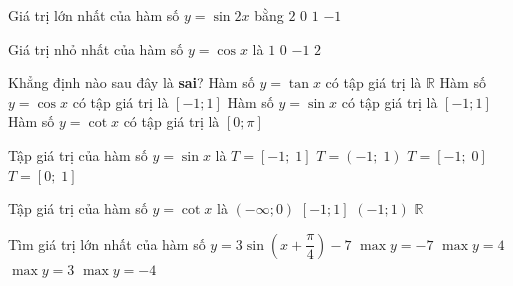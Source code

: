 \begin{ex}%
	Giá trị lớn nhất của hàm  số $y=\sin 2x$ bằng
	 \choice
		 {$2$}
		{$0$} 
		 {\True $1$}
		{$-1$} 
\end{ex}

\begin{ex}%
	Giá trị  nhỏ nhất của hàm số $y=\cos x$ là
	 \choice
		 {$1$}
		{$0$} 
		{\True $-1$} 
		 {$2$}
\end{ex}

\begin{ex}%
	Khẳng định nào sau đây là {\bf sai}? 
	\choice 
		{Hàm số $y=\tan x$  có tập giá trị là $\mathbb{R}$}
		{Hàm  số $y=\cos x$ có tập giá trị là $\left[-1;1\right]$}
		 {Hàm số $y=\sin x$ có tập giá trị là $\left[-1;1\right]$}
		{\True Hàm số  $y=\cot x$ có tập giá trị là $\left[0;\pi \right]$}
\end{ex}

\begin{ex}%
	Tập  giá trị của hàm số $y=\sin x$ là
	 \choice
		{\True  $T=\left[-1;\; 1\right]$}
		 {$T=(-1;\; 1)$}
		{$T=\left[-1;\;  0\right]$}
		 {$T=\left[0;\; 1\right]$}
\end{ex}

\begin{ex}%
	Tập giá trị của hàm số  $y=\cot x$ là
	 \choice
		{$\left( -\infty;0 \right)$} 
		 {$\left[-1;1 \right]$}
		{$\left( -1;1 \right)$} 
		 {\True $\mathbb{R}$}
\end{ex}

\begin{ex}%
	Tìm giá trị lớn nhất của hàm số $y=3\sin \left( x+\dfrac{\pi }{4} \right)-7$ 
	\choice 
		{$\max y=-7$} 
		 {$\max y=4$}
		 {$\max y=3$}
		 {\True $\max y=-4$}
\end{ex}

